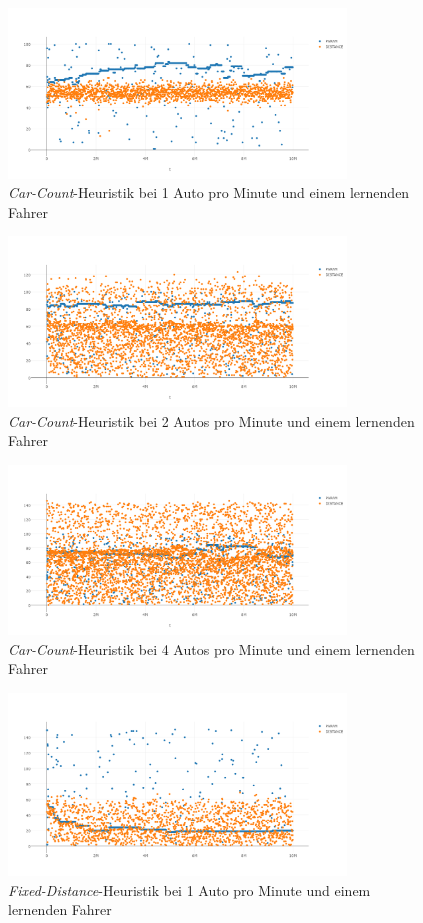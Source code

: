 \begin{figure}[H]
	\includegraphics[width=0.8\textwidth]{analyse/SingleMutant/carcount1.png}
	\caption{\emph{Car-Count}-Heuristik bei 1 Auto pro Minute und einem lernenden Fahrer}\label{fig:ap_sm_cc_1}
\end{figure}
\begin{figure}[H]
	\includegraphics[width=0.8\textwidth]{analyse/SingleMutant/carcount2.png}
	\caption{\emph{Car-Count}-Heuristik bei 2 Autos pro Minute und einem lernenden Fahrer}\label{fig:ap_sm_cc_2}
\end{figure}
\begin{figure}[H]
	\includegraphics[width=0.8\textwidth]{analyse/SingleMutant/carcount4.png}
	\caption{\emph{Car-Count}-Heuristik bei 4 Autos pro Minute und einem lernenden Fahrer}\label{fig:ap_sm_cc_4}
\end{figure}
\begin{figure}[H]
	\includegraphics[width=0.8\textwidth]{analyse/SingleMutant/fixeddistance1.png}
	\caption{\emph{Fixed-Distance}-Heuristik bei 1 Auto pro Minute und einem lernenden Fahrer}\label{fig:ap_sm_fd_1}
\end{figure}
